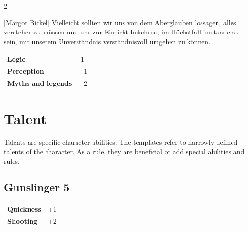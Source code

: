 \begin{multicols}{2}
\begin{tcolorbox}
\begin{pquote}{[Margot Bickel]}
Vielleicht sollten wir uns von dem Aberglauben lossagen, alles verstehen zu müssen und uns zur Einsicht bekehren, im Höchstfall imstande zu sein, mit unserem Unverständnis verständnisvoll umgehen zu können.
\end{pquote}

\vspace{3mm}

\begin{tabular}{@{}ll@{}}
    \textbf{Logic} & -1\\
    \textbf{Perception} & +1\\
    \textbf{Myths and legends} & +2\\
\end{tabular}


\end{tcolorbox}

\section{Talent}

Talents are specific character abilities. The templates refer to narrowly defined talents of the character. As a rule, they are beneficial or add special abilities and rules.

\begin{tcolorbox}
    \subsection*{Gunslinger \hfill \small{5 }}
    \tcblower




\begin{tabular}{@{}ll@{}}
    \textbf{Quickness} & +1\\
    \textbf{Shooting} & +2\\
\end{tabular}



\end{tcolorbox}
\end{multicols}
